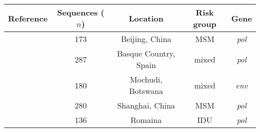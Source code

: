 \begin{tabular}{ccccc}
  Reference & Sequences ($n$) & Location & Risk group & Gene \\
  \hline
  \autocite{wang2015targeting} & 173 & Beijing, China & MSM & \textit{pol} \\
  \autocite{cuevas2009hiv} & 287 & Basque Country, Spain & mixed & \textit{pol} \\
  \autocite{novitsky2013phylogenetic} & \multirow{2}{*}{180} &
  \multirow{2}{*}{Mochudi, Botswana} & \multirow{2}{*}{mixed} &
  \multirow{2}{*}{\textit{env}} \\ \autocite{novitsky2014impact} \\
  \autocite{li2015hiv} & 280 & Shanghai, China & MSM & \textit{pol} \\
  \autocite{niculescu2015recent} & 136 & Romaina & IDU & \textit{pol} \\
  \hline
\end{tabular}
